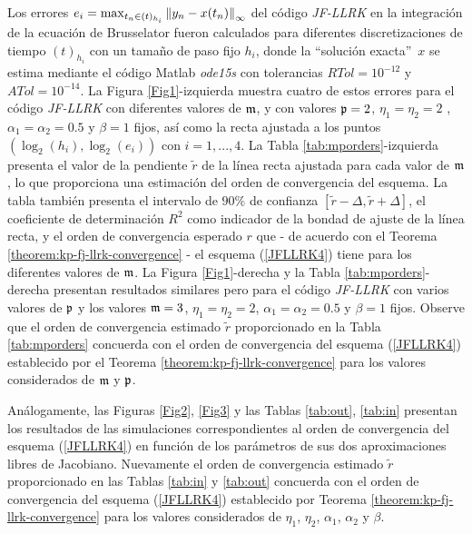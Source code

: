Los errores $e_i=\max_{t_n\in(t)_{h_i}}\left\lVert y_n-x(t_n) \right\rVert_\infty$ del código \textit{JF-LLRK} en la integración de la ecuación de Brusselator fueron calculados para diferentes discretizaciones de tiempo $(t)_{h_i}$ con un tamaño de paso fijo $h_i$, donde la \textquotedblleft solución exacta\textquotedblright ~$x$ se estima mediante el código Matlab \textit{ode15s} con tolerancias $RTol= 10^{-12}$ y $ATol=10^{-14}$. La Figura \ref{Fig1}-izquierda muestra cuatro de estos errores para el código \textit{JF-LLRK} con diferentes valores de $\mathfrak{m}$, y con valores $\mathfrak{p}=2$, $\eta_1=\eta_2=2$ , $\alpha_1=\alpha_2=0\mathord{.}5$ y $\beta=1$ fijos, así como la recta ajustada a los puntos $(\log_2(h_i),\log_2(e_i))$ con $i=1,. ..,4$. La Tabla \ref{tab:mporders}-izquierda presenta el valor de la pendiente $\widetilde{r}$ de la línea recta ajustada para cada valor de $\mathfrak{m}$, lo que proporciona una estimación del orden de convergencia del esquema. La tabla también presenta el intervalo de $90\%$ de confianza $[\widetilde{r}-\varDelta,\widetilde{r}+\varDelta]$, el coeficiente de determinación $R^2$ como indicador de la bondad de ajuste de la línea recta, y el orden de convergencia esperado $r$ que - de acuerdo con el Teorema \ref {theorem:kp-fj-llrk-convergence} - el esquema (\ref{JFLLRK4}) tiene para los diferentes valores de $\mathfrak{m}$. La Figura \ref{Fig1}-derecha y la Tabla \ref{tab:mporders}-derecha presentan resultados similares pero para el código \textit{JF-LLRK} con varios valores de $\mathfrak{p}$ y los valores $\mathfrak{m}=3$, $\eta_1=\eta_2=2$, $\alpha_1=\alpha_2=0\mathord{.}5$ y $\beta=1$ fijos. Observe que el orden de convergencia estimado $\widetilde{r}$ proporcionado en la Tabla \ref{tab:mporders} concuerda con el orden de convergencia del esquema (\ref{JFLLRK4}) establecido por el Teorema \ref{theorem:kp-fj-llrk-convergence} para los valores considerados de $\mathfrak{m}$ y $\mathfrak{p}$.

Análogamente, las Figuras \ref{Fig2}, \ref{Fig3} y las Tablas \ref{tab:out}, \ref{tab:in} presentan los resultados de las simulaciones correspondientes al orden de convergencia del esquema (\ref{JFLLRK4}) en función de los parámetros de sus dos aproximaciones libres de Jacobiano. Nuevamente el orden de convergencia estimado $\widetilde{r}$ proporcionado en las Tablas \ref{tab:in} y \ref{tab:out} concuerda con el orden de convergencia del esquema (\ref{JFLLRK4}) establecido por Teorema \ref{theorem:kp-fj-llrk-convergence} para los valores considerados de $\eta_1$, $\eta_2$, $\alpha_1$, $\alpha_2$ y $\beta$.

\vspace{0.4cm}


